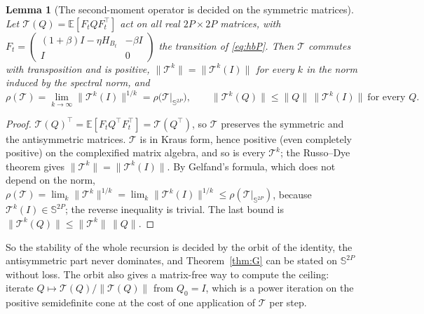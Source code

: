 \documentclass[11pt]{article}
\newtheorem{lemma}[theorem]{Lemma}
\theoremstyle{remark}
\newcommand{\E}{\mathbb{E}}
\begin{document}
\begin{lemma}[The second-moment operator is decided on the symmetric matrices]\label{lem:russodye}
Let $\mathcal T(Q)=\E[F_tQF_t^\top]$ act on all real $2P\times2P$ matrices, with $F_t=\begin{pmatrix}(1+\beta)I-\eta H_{B_t}&-\beta I\\I&0\end{pmatrix}$ the transition of \eqref{eq:hbP}. Then $\mathcal T$ commutes with transposition and is positive, $\|\mathcal T^k\|=\|\mathcal T^k(I)\|$ for every $k$ in the norm induced by the spectral norm, and
\[
\rho(\mathcal T)=\lim_{k\to\infty}\|\mathcal T^k(I)\|^{1/k}=\rho\big(\mathcal T|_{\mathbb S^{2P}}\big),\qquad\|\mathcal T^k(Q)\|\le\|Q\|\,\|\mathcal T^k(I)\|\ \text{for every }Q .
\]
\end{lemma}
\begin{proof}
$\mathcal T(Q)^\top=\E[F_tQ^\top F_t^\top]=\mathcal T(Q^\top)$, so $\mathcal T$ preserves the symmetric and the antisymmetric matrices. $\mathcal T$ is in Kraus form, hence positive (even completely positive) on the complexified matrix algebra, and so is every $\mathcal T^k$; the Russo--Dye theorem gives $\|\mathcal T^k\|=\|\mathcal T^k(I)\|$. By Gelfand's formula, which does not depend on the norm, $\rho(\mathcal T)=\lim_k\|\mathcal T^k\|^{1/k}=\lim_k\|\mathcal T^k(I)\|^{1/k}\le\rho(\mathcal T|_{\mathbb S^{2P}})$, because $\mathcal T^k(I)\in\mathbb S^{2P}$; the reverse inequality is trivial. The last bound is $\|\mathcal T^k(Q)\|\le\|\mathcal T^k\|\,\|Q\|$.
\end{proof}
So the stability of the whole recursion is decided by the orbit of the identity, the antisymmetric part never dominates, and Theorem~\ref{thm:G} can be stated on $\mathbb S^{2P}$ without loss. The orbit also gives a matrix-free way to compute the ceiling: iterate $Q\mapsto\mathcal T(Q)/\|\mathcal T(Q)\|$ from $Q_0=I$, which is a power iteration on the positive semidefinite cone at the cost of one application of $\mathcal T$ per step.
\end{document}
